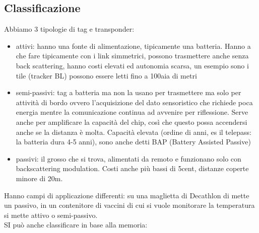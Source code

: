 \documentclass[oneside, 12pt]{extbook}
\begin{document}
\subsection{Classificazione}
Abbiamo 3 tipologie di tag e transponder:
\begin{itemize}
	\item attivi: hanno una fonte di alimentazione, tipicamente una batteria. Hanno a che fare tipicamente con i link simmetrici, possono trasmettere anche senza back scattering, hanno costi elevati ed autonomia scarsa, un esempio sono i tile (tracker BL) possono essere letti fino a 100aia di metri
	\item semi-passivi: tag a batteria ma non la usano per trasmettere ma solo per attività di bordo ovvero l'acquisizione del dato sensoristico che richiede poca energia mentre la comunicazione continua ad avvenire per riflessione. Serve anche per amplificare la capacità del chip, così che questo possa accendersi anche se la distanza è molta. Capacità elevata (ordine di anni, es il telepass: la batteria dura 4-5 anni), sono anche detti BAP (Battery Assisted Passive)
	\item passivi: il grosso che si trova, alimentati da remoto e funzionano solo con backscattering modulation. Costi anche più bassi di 5cent, distanze coperte minore di 20m.
\end{itemize}
Hanno campi di applicazione differenti: su una maglietta di Decathlon di mette un passivo, in un contenitore di vaccini di cui si vuole monitorare la temperatura si mette attivo o semi-passivo.\\SI può anche classificare in base alla memoria:
\end{document}
